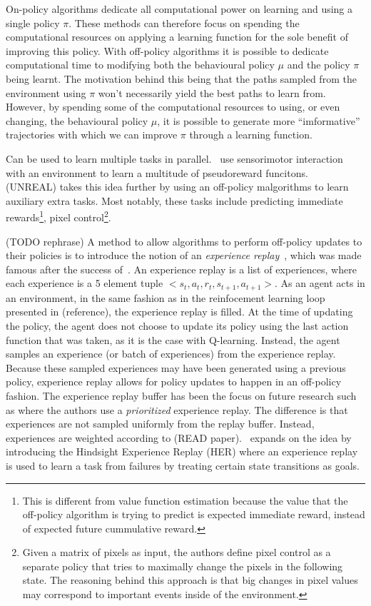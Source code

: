 \documentclass{../main.tex}{}
\begin{document}
On-policy algorithms dedicate all computational power on learning and using a single policy $\pi$. These methods can therefore focus on spending the computational resources on applying a learning function for the sole benefit of improving this policy. With off-policy algorithms it is possible to dedicate computational time to modifying both the behavioural policy $\mu$ and the policy $\pi$ being learnt. The motivation behind this being that the paths sampled from the environment using $\pi$ won't necessarily yield the best paths to learn from. However, by spending some of the computational resources to using, or even changing, the behavioural policy $\mu$, it is possible to generate more ``imformative'' trajectories with which we can improve $\pi$ through a learning function.

Can be used to learn multiple tasks in parallel.~\cite{Sutton2010} use sensorimotor interaction with an environment to learn a multitude of pseudoreward funcitons.~\cite{Jaderberg2016} (UNREAL) takes this idea further by using an off-policy malgorithms to learn auxiliary extra tasks. Most notably, these tasks include predicting immediate rewards\footnote{This is different from value function estimation because the value that the off-policy algorithm is trying to predict is expected immediate reward, instead of expected future cummulative reward.}, pixel control\footnote{Given a matrix of pixels as input, the authors define pixel control as a separate policy that tries to maximally change the pixels in the following state. The reasoning behind this approach is that big changes in pixel values may correspond to important events inside of the environment.}.

(TODO rephrase)
A method to allow algorithms to perform off-policy updates to their policies is to introduce the notion of an \textit{experience replay}~\citep{Lin1993}, which was made famous after the success of~\cite{Mnih2013}. An experience replay is a list of experiences, where each experience is a 5 element tuple $<s_t, a_t, r_t, s_{t+1}, a_{t+1}>$. As an agent acts in an environment, in the same fashion as in the reinfocement learning loop presented in (reference), the experience replay is filled. At the time of updating the policy, the agent does not choose to update its policy using the last action function that was taken, as it is the case with Q-learning. Instead, the agent samples an experience (or batch of experiences) from the experience replay. Because these sampled experiences may have been generated using a previous policy, experience replay allows for policy updates to happen in an off-policy fashion. The experience replay buffer has been the focus on future research such as \citep{Schaul2015, Hessel2017} where the authors use a \textit{prioritized} experience replay. The difference is that experiences are not sampled uniformly from the replay buffer. Instead, experiences are weighted according to (READ paper).~\cite{Andrychowicz2017} expands on the idea by introducing the Hindsight Experience Replay (HER) where an experience replay is used to learn a task from failures by treating certain state transitions as goals.
\end{document}
